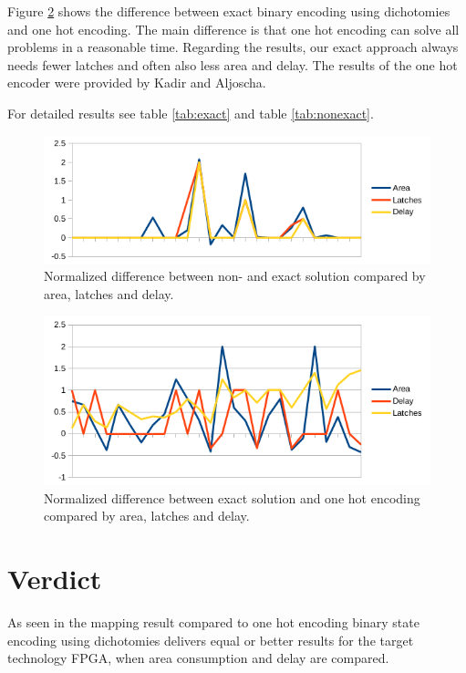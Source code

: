 Figure \ref{fig:diff_onehot} shows the difference between exact binary encoding using dichotomies and one hot encoding. The main difference is that one hot encoding can solve all problems in a reasonable time. Regarding the results, our exact approach always needs fewer latches and often also less area and delay. The results of the one hot encoder were provided by Kadir and Aljoscha.

For detailed results see table \ref{tab:exact} and table \ref{tab:nonexact}.

\begin{figure}[H]
	\centering
	\includegraphics{graphics/diff.png}
	\caption{Normalized difference between non- and exact solution compared by area, latches and delay.}
	\label{fig:diff}
\end{figure}

\begin{figure}[H]
	\centering
	\includegraphics{graphics/diff_onehot.png}
	\caption{Normalized difference between exact solution and one hot encoding compared by area, latches and delay.}
	\label{fig:diff_onehot}
\end{figure}

\section{Verdict}
As seen in the mapping result compared to one hot encoding binary state encoding using dichotomies delivers equal or better results for the target technology FPGA, when area consumption and delay are compared.


